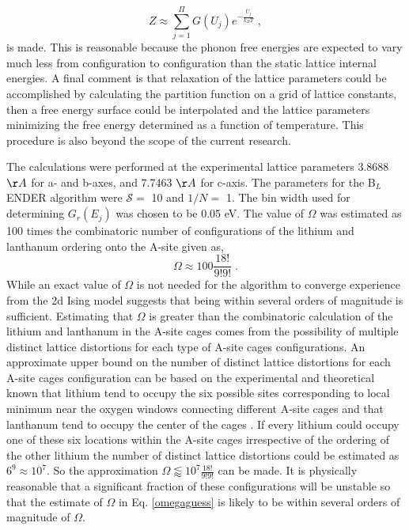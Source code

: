 \documentclass[aps,pre,reprint,superscriptaddress,showkeys]{revtex4-2}
\begin{document}
 \begin{equation}
 Z\approx \sum_{j=1}^{\Pi}G(U_j)e^{-\frac{U_j}{k_BT}}\;,
 \end{equation}
 is made. This is reasonable because the phonon free energies are expected to vary much less from configuration to configuration than the static lattice internal energies. A final comment is that relaxation of the lattice parameters could be accomplished by calculating the partition function on a grid of lattice constants, then a free energy surface could be interpolated and the lattice parameters minimizing the free energy determined as a function of temperature. This procedure is also beyond the scope of the current research. 
 
  The calculations were performed at the experimental lattice parameters 3.8688 $\AA$ for a- and b-axes, and 7.7463 $\AA$ for c-axis. The parameters for the B$_L$ENDER algorithm were $\mathcal{S}=$ 10 and $1/N=$ 1. The bin width used for determining $G_r(E_j)$ was chosen to be 0.05 eV. The value of $\Omega$ was estimated as 100 times the combinatoric number of configurations of the lithium and lanthanum ordering onto the A-site  given as, 
\begin{equation}
\Omega \approx 100\frac{18!}{9!9!} \;.
\label{omegaguess}
\end{equation}
While an exact value of $\Omega$ is not needed for the algorithm to converge experience from the 2d Ising model suggests that being within several orders of magnitude is sufficient. Estimating that $\Omega$ is greater than the combinatoric calculation of the lithium and lanthanum in the A-site cages comes from the possibility of multiple distinct lattice distortions for each type of A-site cages configurations. An approximate upper bound on the number of distinct lattice distortions for each A-site cages configuration can be based on the experimental and theoretical known that lithium tend to occupy the six possible sites corresponding to local minimum near the oxygen windows connecting different  A-site cages and that lanthanum tend to occupy the center of the cages \cite{Asitedistribution,imaginaryphonons,Li_La_ordering_computational,lithiumpos}. If every lithium could occupy one of these six locations within the A-site cages irrespective of the ordering of the other lithium the number of distinct lattice distortions could be estimated as $6^{9}\approx 10^7$. So the approximation $\Omega  \lessapprox 10^7  \frac{18!}{9!9!}$ can be made. It is physically reasonable that a significant fraction of these configurations will be unstable so that the estimate of $\Omega$ in Eq. \ref{omegaguess} is likely to be within several orders of magnitude of  $\Omega$. 
\end{document}
